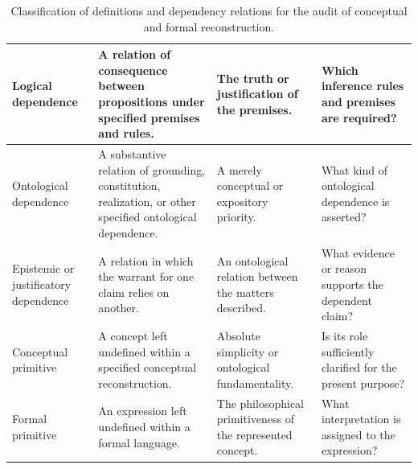 \begin{table}[htbp]
\begin{tabular}{|p{2.7cm}|p{4.0cm}|p{4.1cm}|p{3.0cm}|}
Logical dependence &
A relation of consequence between propositions under specified
premises and rules. &
The truth or justification of the premises. &
Which inference rules and premises are required? \\
\hline

Ontological dependence &
A substantive relation of grounding, constitution, realization,
or other specified ontological dependence. &
A merely conceptual or expository priority. &
What kind of ontological dependence is asserted? \\
\hline

Epistemic or justificatory dependence &
A relation in which the warrant for one claim relies on another. &
An ontological relation between the matters described. &
What evidence or reason supports the dependent claim? \\
\hline

Conceptual primitive &
A concept left undefined within a specified conceptual
reconstruction. &
Absolute simplicity or ontological fundamentality. &
Is its role sufficiently clarified for the present purpose? \\
\hline

Formal primitive &
An expression left undefined within a formal language. &
The philosophical primitiveness of the represented concept. &
What interpretation is assigned to the expression? \\
\hline

\end{tabular}
\caption{Classification of definitions and dependency relations
for the audit of conceptual and formal reconstruction.}
\label{tab:definition-and-dependency-audit}
\end{table}

